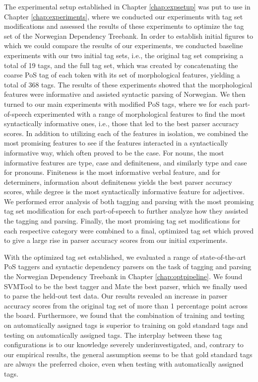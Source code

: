 \documentclass[a4paper,12pt,english]{book}
\begin{document}
The experimental setup established in Chapter \ref{chap:expsetup} was put to
use in Chapter \ref{chap:experiments}, where we conducted our experiments with
tag set modifications and assessed the results of these experiments to optimize
the tag set of the Norwegian Dependency Treebank. In order to establish initial
figures to which we could compare the results of our experiments, we conducted
baseline experiments with our two initial tag sets, i.e., the original tag set
comprising a total of 19 tags, and the full tag set, which was created by
concatenating the coarse PoS tag of each token with its set of morphological
features, yielding a total of 368 tags. The results of these experiments showed
that the morphological features were informative and assisted syntactic parsing
of Norwegian. We then turned to our main experiments with modified PoS tags,
where we for each part-of-speech experimented with a range of morphological
features to find the most syntactically informative ones, i.e., those that led
to the best parser accuracy scores. In addition to utilizing each of the
features in isolation, we combined the most promising features to see if the
features interacted in a syntactically informative way, which often proved to
be the case. For nouns, the most informative features are type, case and
definiteness, and similarly type and case for pronouns. Finiteness is the most
informative verbal feature, and for determiners, information about definiteness
yields the best parser accuracy scores, while degree is the most syntactically
informative feature for adjectives. We performed error analysis of both
tagging and parsing with the most promising tag set modification for each
part-of-speech to further analyze how they assisted the tagging and parsing.
Finally, the most promising tag set modifications for each respective category
were combined to a final, optimized tag set which proved to give a large rise in
parser accuracy scores from our initial experiments.

With the optimized tag set established, we evaluated a range of
state-of-the-art PoS taggers and syntactic dependency parsers on the task of
tagging and parsing the Norwegian Dependency Treebank in Chapter
\ref{chap:optpipeline}. We found SVMTool to be the best tagger and Mate the
best parser, which we finally used to parse the held-out test data. Our results
revealed an increase in parser accuracy scores from the original tag set of
more than 1 percentage point across the board. Furthermore, we found that the
combination of training and testing on automatically assigned tags is superior
to training on gold standard tags and testing on automatically assigned tags.
The interplay between these tag configurations is to our knowledge severely
underinvestigated, and, contrary to our empirical results, the general
assumption seems to be that gold standard tags are always the preferred choice,
even when testing with automatically assigned tags.
\end{document}
